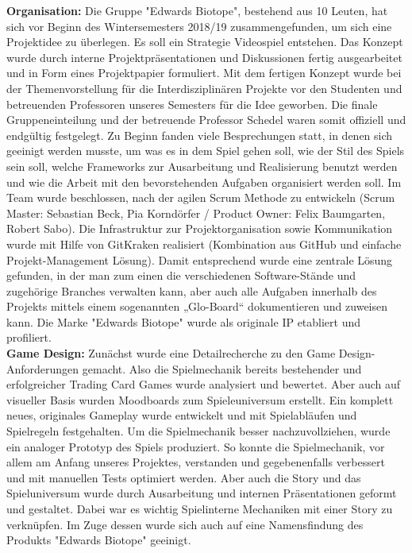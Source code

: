 \textbf{Organisation:}
Die Gruppe "Edwards Biotope", bestehend aus 10 Leuten, hat sich vor Beginn des Wintersemesters 2018/19 zusammengefunden, um sich eine Projektidee zu überlegen. Es soll ein Strategie Videospiel entstehen. Das Konzept wurde durch interne Projektpräsentationen und Diskussionen fertig ausgearbeitet und in Form eines Projektpapier formuliert. Mit dem fertigen Konzept wurde bei der Themenvorstellung für die Interdisziplinären Projekte vor den Studenten und betreuenden Professoren unseres Semesters für die Idee geworben. Die finale Gruppeneinteilung und der betreuende Professor Schedel waren somit offiziell und endgültig festgelegt. Zu Beginn fanden viele Besprechungen statt, in denen sich geeinigt werden musste, um was es in dem Spiel gehen soll, wie der Stil des Spiels sein soll, welche Frameworks zur Ausarbeitung und Realisierung benutzt werden und wie die Arbeit mit den bevorstehenden Aufgaben organisiert werden soll. Im Team wurde beschlossen, nach der agilen Scrum Methode zu entwickeln (Scrum Master: Sebastian Beck, Pia Korndörfer / Product Owner: Felix Baumgarten, Robert Sabo). Die Infrastruktur zur Projektorganisation sowie Kommunikation wurde mit Hilfe von GitKraken realisiert (Kombination aus GitHub und einfache Projekt-Management Lösung). Damit entsprechend wurde eine zentrale Lösung gefunden, in der man zum einen die verschiedenen Software-Stände und zugehörige Branches verwalten kann, aber auch alle Aufgaben innerhalb des Projekts mittels einem sogenannten „Glo-Board“ dokumentieren und zuweisen kann. Die Marke "Edwards Biotope" wurde als originale IP etabliert und profiliert. 
\\
\textbf{Game Design:}
Zunächst wurde eine Detailrecherche zu den Game Design-Anforderungen gemacht. Also die Spielmechanik bereits bestehender und erfolgreicher Trading Card Games wurde analysiert und bewertet. Aber auch auf visueller Basis wurden Moodboards zum Spieleuniversum erstellt. Ein komplett neues, originales Gameplay wurde entwickelt und mit Spielabläufen und Spielregeln festgehalten. Um die Spielmechanik besser nachzuvollziehen, wurde ein analoger Prototyp des Spiels produziert. So konnte die Spielmechanik, vor allem am Anfang unseres Projektes, verstanden und gegebenenfalls verbessert und mit manuellen Tests optimiert werden. Aber auch die Story und das Spieluniversum wurde durch Ausarbeitung und internen Präsentationen geformt und gestaltet. Dabei war es wichtig Spielinterne Mechaniken mit einer Story zu verknüpfen. Im Zuge dessen wurde sich auch auf eine Namensfindung des Produkts "Edwards Biotope" geeinigt. 
